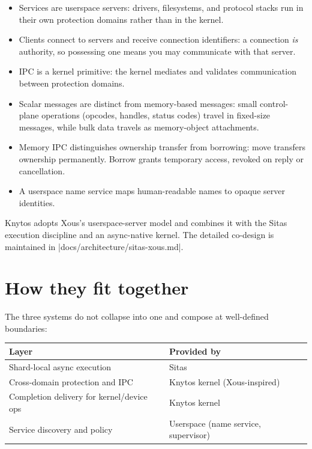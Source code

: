 \begin{itemize}
    \item Services are userspace servers: drivers, filesystems, and
        protocol stacks run in their own protection domains rather than in the
        kernel.
    \item Clients connect to servers and receive connection identifiers:
        a connection \emph{is} authority, so possessing one means you may communicate
        with that server.
    \item IPC is a kernel primitive: the kernel mediates and validates
        communication between protection domains.
    \item Scalar messages are distinct from memory-based messages:
        small control-plane operations (opcodes, handles, status codes) travel
        in fixed-size messages, while bulk data travels as memory-object attachments.
    \item Memory IPC distinguishes ownership transfer from borrowing:
        move transfers ownership permanently. Borrow grants temporary access,
        revoked on reply or cancellation.
    \item A userspace name service maps human-readable names to opaque
        server identities.
\end{itemize}

Knytos adopts Xous's userspace-server model and combines it with the Sitas
execution discipline and an async-native kernel. The detailed co-design is
maintained in \repofile|docs/architecture/sitas-xous.md|.

\section{How they fit together}

The three systems do not collapse into one and compose at well-defined
boundaries:

\begin{center}
\begin{tabular}{|l|l|}
\hline
\textbf{Layer} & \textbf{Provided by} \\
\hline
Shard-local async execution & Sitas \\
Cross-domain protection and IPC & Knytos kernel (Xous-inspired) \\
Completion delivery for kernel/device ops & Knytos kernel \\
Service discovery and policy & Userspace (name service, supervisor) \\
\hline
\end{tabular}
\end{center}

